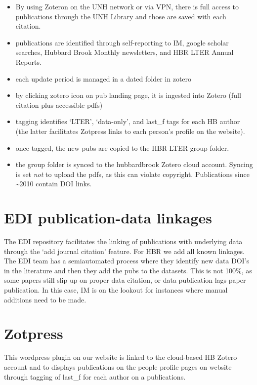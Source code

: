\documentclass[
  letterpaper,
  DIV=11,
  numbers=noendperiod]{scrreprt}
\providecommand{\tightlist}{%
  \setlength{\itemsep}{0pt}\setlength{\parskip}{0pt}}\usepackage{longtable,booktabs,array}
\begin{document}
\begin{itemize}
\tightlist
\item
  By using Zoteron on the UNH network or via VPN, there is full access
  to publications through the UNH Library and those are saved with each
  citation.
\item
  publications are identified through self-reporting to IM, google
  scholar searches, Hubbard Brook Monthly newsletters, and HBR LTER
  Annual Reports.
\item
  each update period is managed in a dated folder in zotero
\item
  by clicking zotero icon on pub landing page, it is ingested into
  Zotero (full citation plus accessible pdfs)
\item
  tagging identifies `LTER', `data-only', and last\_f tags for each HB
  author (the latter facilitates Zotpress links to each person's profile
  on the website).
\item
  once tagged, the new pubs are copied to the HBR-LTER group folder.
\item
  the group folder is synced to the hubbardbrook Zotero cloud account.
  Syncing is set \emph{not} to upload the pdfs, as this can violate
  copyright. Publications since \textasciitilde2010 contain DOI links.
\end{itemize}

\section{EDI publication-data
linkages}\label{edi-publication-data-linkages}

The EDI repository facilitates the linking of publications with
underlying data through the `add journal citation' feature. For HBR we
add all known linkages. The EDI team has a semiautomated process where
they identify new data DOI's in the literature and then they add the
pubs to the datasets. This is not 100\%, as some papers still slip up on
proper data citation, or data publication lags paper publication. In
this case, IM is on the lookout for instances where manual additions
need to be made.

\section{Zotpress}\label{zotpress}

This wordpress plugin on our website is linked to the cloud-based HB
Zotero account and to displays publications on the people profile pages
on website through tagging of last\_f for each author on a publications.
\end{document}
